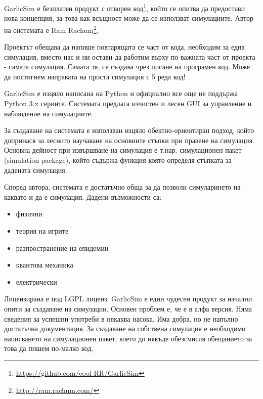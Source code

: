 			GarlicSim е безплатен продукт с отворен код\footnote{\url{https://github.com/cool-RR/GarlicSim}}, 
			който се опитва да предостави нова концепция, за това как всъщност може да се използват симулациите.
			Автор на системата е Ram Rachum\footnote{\url{http://ram.rachum.com/}}.			
			
			
				Проектът обещава да напише повтарящата се част от кода, необходим за една симулация, вместо нас и ни
				остави да работим върху по-важната част от проекта - самата симулация. Самата тя, се създава чрез 
				писане на програмен код. Може да постигнем направата на проста симулация с 5 реда код!   			
			
				
				GarlicSim е изцяло написана на Python и официално все още не поддържа Python 3.x сериите. 
				Системата предлага изчистен и лесен GUI за управление и наблюдение на симулациите. 			
			
			
				За създаване на системата е използван изцяло обектно-ориентиран подход, който допринася за лесното
				научаване на основните стъпки при правене на симулация. Основна дейност при извършване на симулация
				е т.нар. симулационен пакет (simulation package), който съдържа функция която определя стъпката за
				дадената симулация.
			
			
				Според автора, системата е достатъчно обща за да позволи симуларинето на каквато и да е симулация.
				Дадени възможности са:

				\begin{itemize}
					\item физични
					\item теория на игрите
					\item разпространение на епидемии
					\item квантова механика
					\item електрически
				\end{itemize}								
				
				Лицензирана е под LGPL лиценз. GarlicSim е един чудесен продукт за начални опити за създаване на симулации. 
				Основен проблем е, че е в алфа версия. Няма сведения за успешни употреби в някаква насока.
				Има добра, но не напълно достатъчна документация. За създаване на собствена симулация е необходимо
				написването на симулационен пакет, което до някъде обезсмисля обещанието за това да пишем по-малко код.
				\cite{GarlicSim}